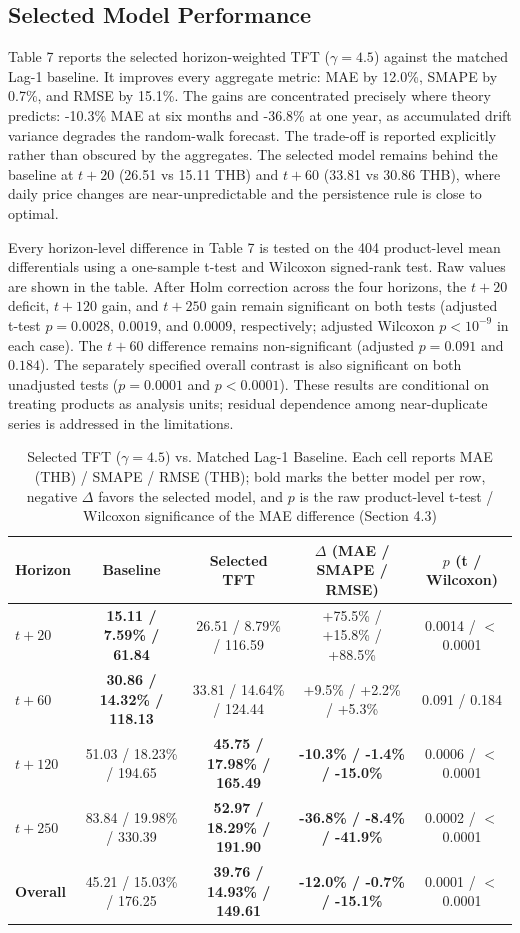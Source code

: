 \documentclass[review,3p,times]{elsarticle}
\begin{document}
\subsection{Selected Model Performance}

Table 7 reports the selected horizon-weighted TFT ($\gamma = 4.5$) against the matched Lag-1 baseline. It improves every aggregate metric: MAE by 12.0\%, SMAPE by 0.7\%, and RMSE by 15.1\%. The gains are concentrated precisely where theory predicts: -10.3\% MAE at six months and -36.8\% at one year, as accumulated drift variance degrades the random-walk forecast. The trade-off is reported explicitly rather than obscured by the aggregates. The selected model remains behind the baseline at $t+20$ (26.51 vs 15.11 THB) and $t+60$ (33.81 vs 30.86 THB), where daily price changes are near-unpredictable and the persistence rule is close to optimal.

Every horizon-level difference in Table 7 is tested on the 404 product-level mean differentials using a one-sample t-test and Wilcoxon signed-rank test. Raw values are shown in the table. After Holm correction across the four horizons, the $t+20$ deficit, $t+120$ gain, and $t+250$ gain remain significant on both tests (adjusted t-test $p=0.0028$, $0.0019$, and $0.0009$, respectively; adjusted Wilcoxon $p<10^{-9}$ in each case). The $t+60$ difference remains non-significant (adjusted $p=0.091$ and $0.184$). The separately specified overall contrast is also significant on both unadjusted tests ($p=0.0001$ and $p<0.0001$). These results are conditional on treating products as analysis units; residual dependence among near-duplicate series is addressed in the limitations.

\begin{table}[htbp]\centering
\caption{Selected TFT ($\gamma = 4.5$) vs. Matched Lag-1 Baseline. Each cell reports MAE (THB) / SMAPE / RMSE (THB); bold marks the better model per row, negative $\Delta$ favors the selected model, and $p$ is the raw product-level t-test / Wilcoxon significance of the MAE difference (Section 4.3)}
\small
\begin{tabular}{lcccc}
\toprule
Horizon & Baseline & Selected TFT & $\Delta$ (MAE / SMAPE / RMSE) & $p$ (t / Wilcoxon) \\
\midrule
$t+20$ & \textbf{15.11 / 7.59\% / 61.84} & 26.51 / 8.79\% / 116.59 & +75.5\% / +15.8\% / +88.5\% & 0.0014 / $<$0.0001 \\
$t+60$ & \textbf{30.86 / 14.32\% / 118.13} & 33.81 / 14.64\% / 124.44 & +9.5\% / +2.2\% / +5.3\% & 0.091 / 0.184 \\
$t+120$ & 51.03 / 18.23\% / 194.65 & \textbf{45.75 / 17.98\% / 165.49} & \textbf{-10.3\% / -1.4\% / -15.0\%} & 0.0006 / $<$0.0001 \\
$t+250$ & 83.84 / 19.98\% / 330.39 & \textbf{52.97 / 18.29\% / 191.90} & \textbf{-36.8\% / -8.4\% / -41.9\%} & 0.0002 / $<$0.0001 \\
\textbf{Overall} & 45.21 / 15.03\% / 176.25 & \textbf{39.76 / 14.93\% / 149.61} & \textbf{-12.0\% / -0.7\% / -15.1\%} & 0.0001 / $<$0.0001 \\
\bottomrule
\end{tabular}
\end{table}
\end{document}
